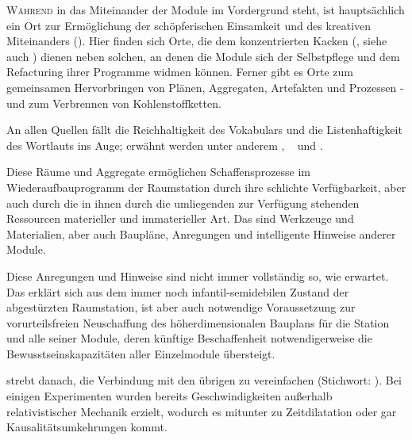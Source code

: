 \begin{newstuff}
   \lettrine{W}{ährend} in  das Miteinander der Module im Vordergrund steht, ist  hauptsächlich ein Ort zur Ermöglichung der schöpferischen Einsamkeit und des kreativen Miteinanders (). Hier finden sich Orte, die dem konzentrierten Kacken (, siehe auch ) dienen neben solchen, an denen die Module sich der Selbstpflege und dem Refacturing ihrer Programme widmen können. Ferner gibt es Orte zum gemeinsamen Hervorbringen von Plänen, Aggregaten, Artefakten und Prozessen - und zum Verbrennen von Kohlenstoffketten. 


   An allen Quellen fällt die Reichhaltigkeit des Vokabulars und die Listenhaftigkeit des Wortlauts ins Auge; erwähnt werden unter anderem , ~\cite{ctour} und .

    Diese Räume und Aggregate ermöglichen Schaffensprozesse im Wiederaufbauprogramm der Raumstation durch ihre schlichte Verfügbarkeit, aber auch durch die in ihnen durch die umliegenden  zur Verfügung stehenden Ressourcen materieller und immaterieller Art. Das sind Werkzeuge und Materialien, aber auch Baupläne, Anregungen und intelligente Hinweise anderer Module. 

    Diese Anregungen und Hinweise sind nicht immer vollständig so, wie erwartet. Das erklärt sich aus dem immer noch infantil-semidebilen Zustand der abgestürzten Raumstation, ist aber auch notwendige Voraussetzung zur vorurteilsfreien Neuschaffung des höherdimensionalen Bauplans für die Station und alle seiner Module, deren künftige Beschaffenheit notwendigerweise die Bewusstseinskapazitäten aller Einzelmodule übersteigt.

     strebt danach, die Verbindung mit den übrigen  zu vereinfachen (Stichwort: ). Bei einigen Experimenten wurden bereits Geschwindigkeiten außerhalb relativistischer Mechanik erzielt, wodurch es mitunter zu Zeitdilatation oder gar Kausalitätsumkehrungen kommt. 
    


\end{newstuff}
